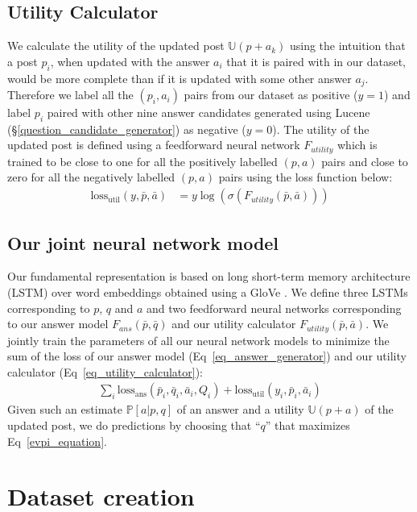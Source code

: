 \documentclass[11pt,a4paper]{article}
\newcommand{\U}{\mathbb{U}}
\begin{document}
\subsection{Utility Calculator}\label{utility_calculator}
We calculate the utility of the updated post $\U(p + a_k)$ using the intuition that a post $p_i$, when updated with the answer $a_i$ that it is paired with in our dataset, would be more complete than if it is updated with some other answer $a_j$. Therefore we label all the $(p_i, a_i)$ pairs from our dataset as positive ($y=1$) and label $p_i$ paired with other nine answer candidates generated using Lucene (\S\ref{question_candidate_generator}) as negative ($y=0$). The utility of the updated post is defined using a feedforward neural network $F_{utility}$ which is trained to be close to one for all the positively labelled $(p,a)$ pairs and close to zero for all the negatively labelled $(p, a)$ pairs using the loss function below:
\begin{align}\label{eq_utility_calculator}
\textrm{loss}_{\textrm{util}}(y, \bar p, \bar a) &= y \log(\sigma (F_{utility}(\bar{p}, \bar{a})))
\end{align}

\subsection{Our joint neural network model}\label{neural_network}
Our fundamental representation is based on long short-term memory architecture (LSTM) \cite{hochreiter1997long} over word embeddings obtained using a GloVe \cite{pennington2014glove}. We define three LSTMs corresponding to $p$, $q$ and $a$ and two feedforward neural networks corresponding to our answer model $F_{ans}(\bar{p},\bar{q})$ and our utility calculator $F_{utility}(\bar{p}, \bar{a})$. We jointly train the parameters of all our neural network models to minimize the sum of the loss of our answer model (Eq~\ref{eq_answer_generator}) and our utility calculator (Eq~\ref{eq_utility_calculator}):
%
\begin{align}
\sum_i \textrm{loss}_{\textrm{ans}}(\bar p_i, \bar q_i, \bar a_i, Q_i)  
+  \textrm{loss}_{\textrm{util}}(y_i, \bar p_i, \bar a_i)
\end{align}
%
Given such an estimate $\mathbb{P}[a|p,q]$ of an answer and a utility $\U(p+a)$ of the updated post, we do predictions by choosing that ``$q$'' that maximizes Eq~\ref{evpi_equation}. 

\section{Dataset creation}\label{dataset_creation}
\end{document}
